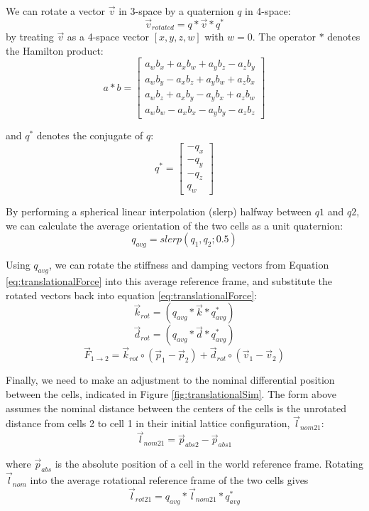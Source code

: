 {  We can rotate a vector $\vec{v}$ in 3-space by a quaternion $q$ in 4-space:
    \[ \vec{v}_{rotated} = q*\vec{v}*q^* \]
  by treating $\vec{v}$ as a 4-space vector $[x, y, z, w]$ with $w=0$.  The operator $*$ denotes the Hamilton product:
  \[ a*b =  \left[ \begin{array}{ccc}
a_wb_x + a_xb_w + a_yb_z - a_zb_y\\
a_wb_y - a_xb_z + a_yb_w + a_zb_x\\
a_wb_z + a_xb_y - a_yb_x + a_zb_w\\
a_wb_w - a_xb_x - a_yb_y - a_zb_z
 \end{array} \right] \] 
 
   and $q^*$ denotes the conjugate of $q$:
    \[ q^{*} =  \left[ \begin{array}{ccc}
-q_x\\
-q_y\\
-q_z\\
q_w
 \end{array} \right] \] 
 
By performing a spherical linear interpolation (slerp) halfway between $q1$ and $q2$, we can calculate the average orientation of the two cells as a unit quaternion:
  \[ q_{avg} = slerp(q_{1}, q_{2}; 0.5) \]
  
Using $q_{avg}$, we can rotate the stiffness and damping vectors from Equation \ref{eq:translationalForce} into this average reference frame, and substitute the rotated vectors back into equation \ref{eq:translationalForce}:
 \[ \vec{k}_{rot} = (q_{avg}*\vec{k}*q_{avg}^*)\]
  \[ \vec{d}_{rot} = (q_{avg}*\vec{d}*q_{avg}^*)\]
  \begin{equation} \label{eq:translationalForceRotStep}
 \vec{F}_{1\rightarrow2} = \vec{k}_{rot} \circ (\vec{p}_1 - \vec{p}_2) + \vec{d}_{rot} \circ (\vec{v}_1 - \vec{v}_2)
 \end{equation}
 
Finally, we need to make an adjustment to the nominal differential position between the cells, indicated in Figure \ref{fig:translationalSim}.  The form above assumes the nominal distance between the centers of the cells is the unrotated distance from cells 2 to cell 1 in their initial lattice configuration, $\vec{l}_{nom21}$:
 \[\vec{l}_{nom21} = \vec{p}_{abs2}-\vec{p}_{abs1}\]
 
 where $\vec{p}_{abs}$ is the absolute position of a cell in the world reference frame.
 Rotating $\vec{l}_{nom}$ into the average rotational reference frame of the two cells gives
 \[\vec{l}_{rot21} = q_{avg}*\vec{l}_{nom21}*q_{avg}^*\]
 
}
